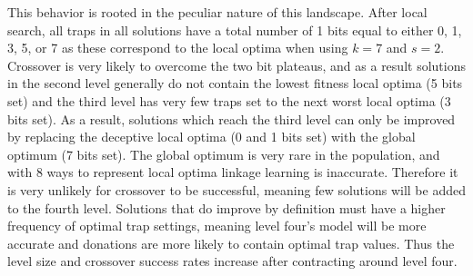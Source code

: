 This behavior is rooted in the peculiar nature
of this landscape.
After local search, all traps in all solutions have a total
number of 1 bits equal to either 0, 1, 3, 5, or 7 as these correspond to the local
optima when using $k=7$ and $s=2$. Crossover is very likely to overcome the
two bit plateaus, and as a result solutions in the second level generally do not
contain the lowest fitness local optima (5 bits set) and the third
level has very few traps set to the next worst local optima (3 bits set). As a result,
solutions which reach the third level can only be improved by replacing the deceptive
local optima (0 and 1 bits set) with the global optimum (7 bits set).
The global optimum is very rare in the population, and with 8 ways to represent local optima
linkage learning is inaccurate. Therefore it is very unlikely for crossover to be successful,
meaning few solutions will be added to the fourth level. Solutions that do improve by
definition must have a higher frequency of optimal trap settings, meaning level four's model
will be more accurate and donations are more likely to contain optimal trap values.
Thus the level size and crossover success rates increase after contracting around level four.
